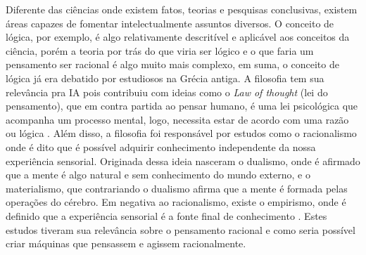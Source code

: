 Diferente das ciências onde existem fatos, teorias e pesquisas conclusivas, existem áreas capazes de fomentar intelectualmente assuntos diversos. O conceito de lógica, por exemplo, é algo relativamente descritível e aplicável aos conceitos da ciência, porém a teoria por trás do que viria ser lógico e o que faria um pensamento ser racional é algo muito mais complexo, em suma, o conceito de lógica já era debatido por estudiosos na Grécia antiga. A filosofia tem sua relevância pra IA pois contribuiu com ideias como o \textit{Law of thought} (lei do pensamento), que em contra partida ao pensar humano, é uma lei psicológica que acompanha um processo mental, logo, necessita estar de acordo com uma razão ou lógica \cite{frege1956thought, russell2003artificial}. Além disso, a filosofia foi responsável por estudos como o racionalismo onde é dito que é possível adquirir conhecimento independente da nossa experiência sensorial. Originada dessa ideia nasceram o dualismo, onde é afirmado que a mente é algo natural e sem conhecimento do mundo externo, e o materialismo, que contrariando o dualismo afirma que a mente é formada pelas operações do cérebro. Em negativa ao racionalismo, existe o empirismo, onde é definido que a experiência sensorial é a fonte final de conhecimento \cite[6]{rationalismvsempiricism, descartes2013rene, russell2003artificial}. Estes estudos tiveram sua relevância sobre o pensamento racional e como seria possível criar máquinas que pensassem e agissem racionalmente.
